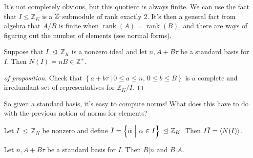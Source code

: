 \begin{remark}

It's not completely obvious, but this quotient is always finite. We can
use the fact that \(I\leq {\mathbb{Z}}_K\) is a
\({\mathbb{Z}}{\hbox{-}}\)submodule of rank exactly 2. It's then a
general fact from algebra that \(A/B\) is finite when
\(\operatorname{rank}(A) = \operatorname{rank}(B)\), and there are ways
of figuring out the number of elements (see normal forms).

\end{remark}

\begin{proposition}

Suppose that \(I{~\trianglelefteq~}{\mathbb{Z}}_K\) is a nonzero ideal
and let \(n, A+B \tau\) be a standard basis for \(I\). Then
\(N(I) = nB \in {\mathbb{Z}}^+\).

\end{proposition}

\begin{proof}[of proposition]

Check that
\(\left\{{ a + b \tau {~\mathrel{\Big|}~}0\leq a \leq n,\, 0 \leq b \leq B}\right\}\)
is a complete and irredundant set of representatives for
\({\mathbb{Z}}_K/I\).

\end{proof}

\begin{remark}

So given a standard basis, it's easy to compute norms! What does this
have to do with the previous notion of norms for elements?

\end{remark}

\begin{theorem}[?]

Let \(I {~\trianglelefteq~}{\mathbb{Z}}_K\) be nonzero and define
\(\mkern 1.5mu\overline{\mkern-1.5muI\mkern-1.5mu}\mkern 1.5mu = \left\{{ \mkern 1.5mu\overline{\mkern-1.5mu\alpha \mkern-1.5mu}\mkern 1.5mu{~\mathrel{\Big|}~}\alpha \in I }\right\} {~\trianglelefteq~}{\mathbb{Z}}_K\).
Then
\(I \mkern 1.5mu\overline{\mkern-1.5muI\mkern-1.5mu}\mkern 1.5mu = \left\langle{ N(I) }\right\rangle\).

\end{theorem}

\begin{lemma}[?]

Let \(n, A + B \tau\) be a standard basis for \(I\). Then
\(B\mathrel{\Big|}n\) and \(B\mathrel{\Big|}A\).

\end{lemma}

